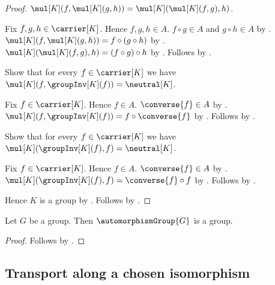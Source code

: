 \begin{proof}
        $\mul[K](f,\mul[K](g,h))=
            \mul[K](\mul[K](f,g),h)$.
    \begin{subproof}
        Fix $f,g,h\in\carrier[K]$.
        Hence $f,g,h\in A$.
        $f\circ g\in A$ and $g\circ h\in A$ by
            .
        $\mul[K](f,\mul[K](g,h))=f\circ(g\circ h)$ by
            .
        $\mul[K](\mul[K](f,g),h)=(f\circ g)\circ h$ by
            .
        Follows by .
    \end{subproof}
    Show that for every $f\in\carrier[K]$ we have
        $\mul[K](f,\groupInv[K](f))=\neutral[K]$.
    \begin{subproof}
        Fix $f\in\carrier[K]$.
        Hence $f\in A$.
        $\converse{f}\in A$ by .
        $\mul[K](f,\groupInv[K](f))=f\circ\converse{f}$ by
            .
        Follows by
            .
    \end{subproof}
    Show that for every $f\in\carrier[K]$ we have
        $\mul[K](\groupInv[K](f),f)=\neutral[K]$.
    \begin{subproof}
        Fix $f\in\carrier[K]$.
        Hence $f\in A$.
        $\converse{f}\in A$ by .
        $\mul[K](\groupInv[K](f),f)=\converse{f}\circ f$ by
            .
        Follows by
            .
    \end{subproof}
    Hence $K$ is a group by
        .
    Follows by .
\end{proof}

\begin{classification}\label{automorphism_group_is_group}
    Let $G$ be a group.
    Then $\automorphismGroup{G}$ is a group.
\end{classification}
\begin{proof}
    Follows by .
\end{proof}

\subsection{Transport along a chosen isomorphism}

